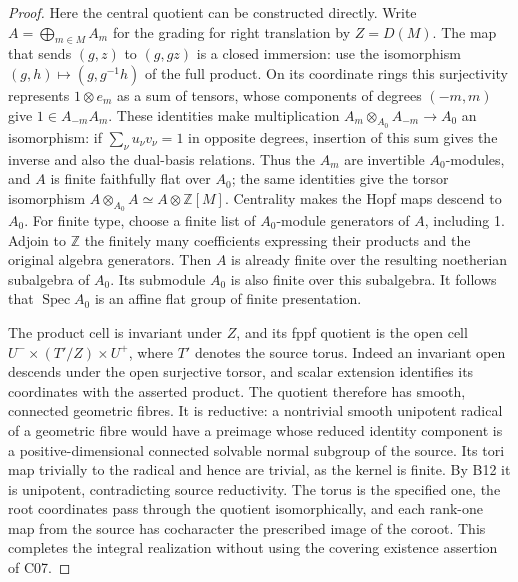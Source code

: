 \documentclass[11pt,a4paper,openany,oneside]{book}
\theoremstyle{resultstyle}
\theoremstyle{definition}
\numberwithin{equation}{chapter}
\DeclareMathOperator{\Spec}{Spec}
\newcommand{\ZZ}{\mathbb{Z}}
\begin{document}
\begin{proof}
Here the central quotient can be constructed directly. Write
\(A=\bigoplus_{m\in M}A_m\) for the grading for right translation by
\(Z=D(M)\). The map that sends \((g,z)\) to \((g,gz)\) is a closed
immersion: use the isomorphism \((g,h)\mapsto(g,g^{-1}h)\) of the full
product. On its coordinate rings this surjectivity represents \(1\otimes
e_m\) as a sum of tensors, whose components of degrees \((-m,m)\) give
\(1\in A_{-m}A_m\). These identities make multiplication
\(A_m\otimes_{A_0}A_{-m}\to A_0\) an isomorphism: if \(\sum_\nu u_\nu
v_\nu=1\) in opposite degrees, insertion of this sum gives the inverse
and also the dual-basis relations. Thus the \(A_m\) are invertible
\(A_0\)-modules, and \(A\) is finite faithfully flat over \(A_0\); the
same identities give the torsor isomorphism \(A\otimes_{A_0}A\simeq
A\otimes\ZZ[M]\). Centrality makes the Hopf maps descend to \(A_0\). For
finite type, choose a finite list of \(A_0\)-module generators of \(A\),
including 1. Adjoin to \(\ZZ\) the finitely many coefficients expressing
their products and the original algebra generators. Then \(A\) is
already finite over the resulting noetherian subalgebra of \(A_0\). Its
submodule \(A_0\) is also finite over this subalgebra. It follows that
\(\Spec A_0\) is an affine flat group of finite presentation.

The product cell is invariant under \(Z\), and its fppf quotient is the
open cell \(U^-\times(T'/Z)\times U^+\), where \(T'\) denotes the source
torus. Indeed an invariant open descends under the open surjective
torsor, and scalar extension identifies its coordinates with the
asserted product. The quotient therefore has smooth, connected geometric
fibres. It is reductive: a nontrivial smooth unipotent radical of a
geometric fibre would have a preimage whose reduced identity component
is a positive-dimensional connected solvable normal subgroup of the
source. Its tori map trivially to the radical and hence are trivial, as
the kernel is finite. By B12 it is unipotent, contradicting source
reductivity. The torus is the specified one, the root coordinates pass
through the quotient isomorphically, and each rank-one map from the
source has cocharacter the prescribed image of the coroot. This
completes the integral realization without using the covering existence
assertion of C07.


\end{proof}
\end{document}
